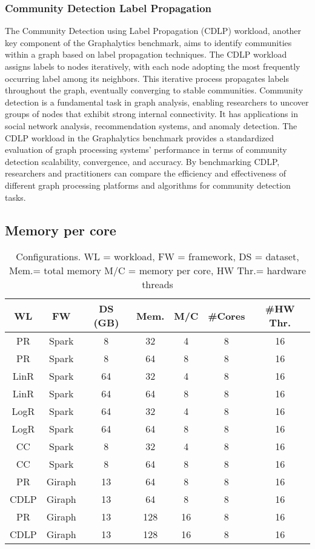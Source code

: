 \subsubsection{Community Detection Label Propagation}
The Community Detection using Label Propagation (CDLP) workload, another key component of the Graphalytics benchmark, aims to identify communities within a graph based on label propagation techniques. The CDLP workload assigns labels to nodes iteratively, with each node adopting the most frequently occurring label among its neighbors. This iterative process propagates labels throughout the graph, eventually converging to stable communities. Community detection is a fundamental task in graph analysis, enabling researchers to uncover groups of nodes that exhibit strong internal connectivity. It has applications in social network analysis, recommendation systems, and anomaly detection. The CDLP workload in the Graphalytics benchmark provides a standardized evaluation of graph processing systems' performance in terms of community detection scalability, convergence, and accuracy. By benchmarking CDLP, researchers and practitioners can compare the efficiency and effectiveness of different graph processing platforms and algorithms for community detection tasks.

\subsection{Memory per core}

\begin{table}[thbp]
  \centering
  \caption{Configurations. WL = workload, FW = framework, DS = dataset, Mem.= total memory M/C = memory per core, HW Thr.= hardware threads}
  \label{tab:setups}
  \begin{tabular}{|c|c|c|c|c|c|c|}
    \hline
	  \textbf{WL} & \textbf{FW} & \textbf{DS (GB)} & \textbf{Mem.} & \textbf{M/C} & \textbf{#Cores} & \textbf{#HW Thr.}\\
    \hline
	  PR & Spark & 8 & 32 & 4 & 8 & 16\\
	  PR & Spark & 8 & 64 & 8 & 8 & 16\\
	  LinR & Spark & 64 & 32 & 4 & 8 & 16\\
	  LinR & Spark & 64 & 64 & 8 & 8 & 16\\
	  LogR & Spark & 64 & 32 & 4 & 8 & 16\\
	  LogR & Spark & 64 & 64 & 8 & 8 & 16\\
	  CC & Spark & 8 & 32 & 4 & 8 & 16\\
	  CC & Spark & 8 & 64 & 8 & 8 & 16\\
	  PR & Giraph & 13 & 64 & 8 & 8 & 16\\
	  CDLP & Giraph & 13 & 64 & 8 & 8 & 16\\
	  PR & Giraph & 13 & 128 & 16 & 8 & 16\\
	  CDLP & Giraph & 13 & 128 & 16 & 8 & 16\\
    \hline
  \end{tabular}
\end{table}


